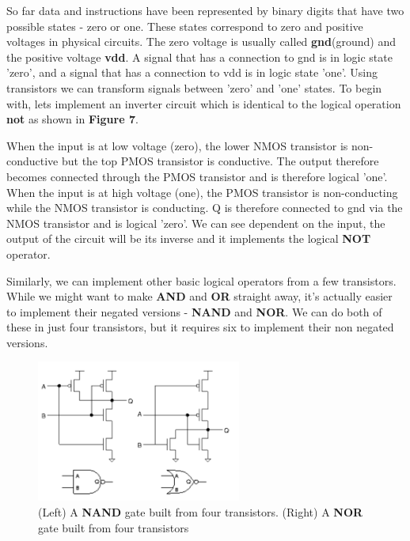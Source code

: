 \documentclass{article}
\begin{document}
	So far data and instructions have been represented by binary digits that have two possible states - zero or one. These states correspond to zero and positive voltages in physical circuits. The zero voltage is usually called \textbf{gnd}(ground) and the positive voltage \textbf{vdd}. A signal that has a connection to gnd is in logic state 'zero', and a signal that has a connection to vdd is in logic state 'one'. Using transistors we can transform signals between 'zero' and 'one' states. To begin with, lets implement an inverter circuit which is identical to the logical operation \textbf{not} as shown in \textbf{Figure 7}.	
	
	When the input is at low voltage (zero), the lower NMOS transistor is non-conductive but the top PMOS transistor is conductive. The output therefore becomes connected through the PMOS transistor and is therefore logical 'one'. When the input is at high voltage (one), the PMOS transistor is non-conducting while the NMOS transistor is conducting. Q is therefore connected to gnd via the NMOS transistor and is logical 'zero'. We can see dependent on the input, the output of the circuit will be its inverse and it implements the logical \textbf{NOT} operator.
	
	Similarly, we can implement other basic logical operators from a few transistors. While we might want to make \textbf{AND} and \textbf{OR} straight away, it's actually easier to implement their negated versions - \textbf{NAND} and \textbf{NOR}. We can do both of these in just four transistors, but it requires six to implement their non negated versions.
	
	\begin{figure}[ht]
		\centering
		\includegraphics[width=0.6\textwidth]{nand_nor_transistors}
		\caption{(Left) A \textbf{NAND} gate built from four transistors.  (Right) A \textbf{NOR} gate built from four transistors}
		\label{fig:nand_nor_transistors}
	\end{figure}
	
\end{document}
